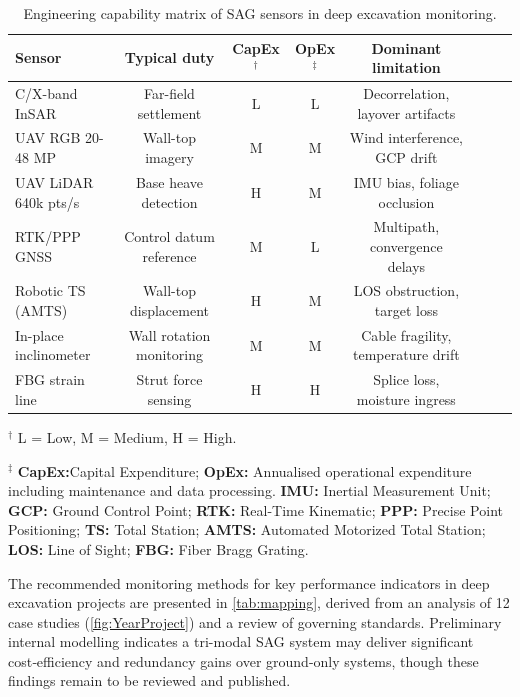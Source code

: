 \documentclass[preprint,11pt,authoryear,3p]{elsarticle}
\begin{document}
\begin{table}[htbp]
\centering\small
\caption{Engineering capability matrix of SAG sensors in deep excavation monitoring.}
\label{tab:sag_capability}
\begin{threeparttable}
\begin{tabular}{@{}lccccllp{4cm}@{}}
\toprule
\textbf{Sensor} & \textbf{Typical duty} & \textbf{CapEx$^{\dagger}$} & \textbf{OpEx$^{\ddagger}$} & \textbf{Dominant limitation} \\
\midrule
C/X-band InSAR  & Far-field settlement & L & L & Decorrelation, layover artifacts \\
UAV RGB 20-48 MP & Wall-top imagery & M & M & Wind interference, GCP drift \\
UAV LiDAR 640k pts/s & Base heave detection & H & M & IMU bias, foliage occlusion \\
RTK/PPP GNSS & Control datum reference & M & L & Multipath, convergence delays \\
Robotic TS (AMTS) & Wall-top displacement & H & M & LOS obstruction, target loss \\
In-place inclinometer & Wall rotation monitoring & M & M & Cable fragility, temperature drift \\
FBG strain line & Strut force sensing & H & H & Splice loss, moisture ingress \\
\bottomrule
\end{tabular}

\vspace{0.8em}
\begin{tablenotes}\footnotesize
\item $^{\dagger}$ L = Low, M = Medium, H = High.
\item $^{\ddagger}$ \textbf{CapEx:}Capital Expenditure; \textbf{OpEx:} Annualised operational expenditure including maintenance and data processing.
\textbf{IMU:} Inertial Measurement Unit; \textbf{GCP:} Ground Control Point;
\textbf{RTK:} Real-Time Kinematic; \textbf{PPP:} Precise Point Positioning;
\textbf{TS:} Total Station; \textbf{AMTS:} Automated Motorized Total Station; \textbf{LOS:} Line of Sight;
\textbf{FBG:} Fiber Bragg Grating.
\end{tablenotes}
\end{threeparttable}
\end{table}

The recommended monitoring methods for key performance indicators in deep excavation projects are presented in \autoref{tab:mapping}, derived from an analysis of 12 case studies (\autoref{fig:YearProject}) and a review of governing standards. Preliminary internal modelling indicates a tri-modal SAG system may deliver significant cost‑efficiency and redundancy gains over ground-only systems, though these findings remain to be reviewed and published.
\end{document}
